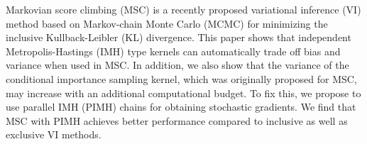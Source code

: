 
Markovian score climbing (MSC) is a recently proposed variational inference (VI) method based on Markov-chain Monte Carlo (MCMC) for minimizing the inclusive Kullback-Leibler (KL) divergence.
This paper shows that independent Metropolis-Hastings (IMH) type kernels can automatically trade off bias and variance when used in MSC.
In addition, we also show that the variance of the conditional importance sampling kernel, which was originally proposed for MSC, may increase with an additional computational budget.
To fix this, we propose to use parallel IMH (PIMH) chains for obtaining stochastic gradients.
We find that MSC with PIMH achieves better performance compared to inclusive as well as exclusive VI methods.

